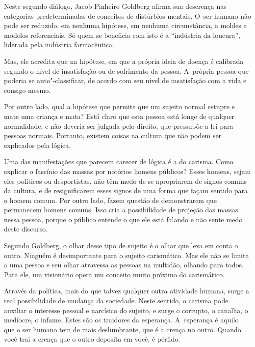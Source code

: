  


Neste segundo diálogo, Jacob Pinheiro Goldberg afirma sua descrença nas
categorias predeterminadas de conceitos de distúrbios mentais. O~ser
humano não pode ser reduzido, em nenhuma hipótese, em nenhuma
circunstância, a moldes e modelos referenciais. Só quem se beneficia com
isto é a ``indústria da loucura'', liderada pela indústria farmacêutica.

Mas, ele acredita que na hipótese, em que a própria ideia de doença é
calibrada segundo o nível de insatisfação ou de sofrimento da pessoa. A~própria pessoa que poderia se auto"-classificar, de acordo com seu nível
de insatisfação com a vida e consigo mesmo.

Por outro lado, qual a hipótese que permite que um sujeito normal
estupre e mate uma criança e mata? Está claro que esta pessoa está longe
de qualquer normalidade, e não deveria ser julgada pelo direito, que
pressupõe a lei para pessoas normais. Portanto, existem coisas na
cultura que não podem ser explicados pela lógica.

Uma das manifestações que parecem carecer de lógica é a do carisma. Como
explicar o fascínio das massas por notórios homens públicos? Esses
homens, sejam eles políticos ou desportistas, não têm medo de se
apropriarem de signos comuns da cultura, e de resignificarem esses
signos de uma forma que façam sentido para o homem comum. Por outro
lado, fazem questão de demonstrarem que permanecem homens comuns. Isso
cria a possibilidade de projeção das massas nessa pessoa, porque o
público entende o que ele está falando e não sente medo deste discurso.

Segundo Goldberg, o olhar desse tipo de sujeito é o olhar que leva em
conta o outro. Ninguém é desimportante para o sujeito carismático. Mas ele não
se limita a uma pessoa e seu olhar atravessa as pessoas na multidão,
olhando para todos. Para ele, um visionário opera um conceito muito
próximo do carismático.

Através da política, mais do que talvez qualquer outra atividade humana,
surge a real possibilidade de mudança da sociedade. Neste sentido, o
carisma pode auxiliar o interesse pessoal e narcísico do sujeito, e
surge o corrupto, o canalha, o medíocre, o infame. Estes são os
traidores da esperança. A~esperança é aquilo que o ser humano tem de
mais deslumbrante, que é a crença no outro. Quando você trai a crença
que o outro deposita em você, é pérfido.

